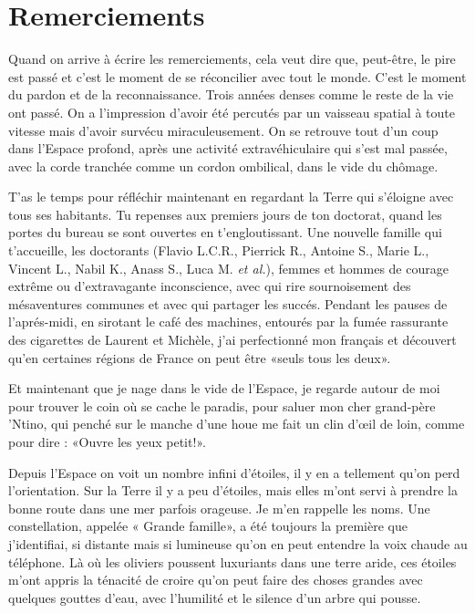 \chapter*{Remerciements}

Quand on arrive \`a \'ecrire les remerciements, cela veut dire que, peut-\^etre, le pire est pass\'e et c'est le moment de se r\'econcilier avec tout le monde. C'est le moment du pardon et de la reconnaissance.  Trois ann\'ees denses comme le reste de la vie ont pass\'e. On a l'impression d'avoir \'et\'e percut\'es par un vaisseau spatial \`a toute vitesse mais d'avoir surv\'ecu miraculeusement. On se retrouve tout d'un coup dans l'Espace profond, apr\`es une activit\'e extrav\'ehiculaire qui s'est mal pass\'ee, avec la corde tranch\'ee comme un cordon ombilical, dans le vide du ch\^omage.

T'as le temps pour r\'efl\'echir maintenant en regardant la Terre qui s'\'eloigne avec tous ses habitants. Tu repenses aux premiers jours de ton doctorat, quand les portes du bureau se sont ouvertes en t'engloutissant. Une nouvelle famille qui t'accueille, les doctorants (Flavio L.C.R., Pierrick R., Antoine S., Marie L., Vincent L., Nabil K., Anass S., Luca M. \textit{et al.}), femmes et hommes de courage extr\^eme ou d'extravagante inconscience, avec qui rire sournoisement des m\'esaventures communes et avec qui partager les succ\'es. Pendant les pauses de l'apr\'es-midi, en sirotant le caf\'e des machines, entour\'es par la fum\'ee rassurante des cigarettes de Laurent et Mich\`ele, j'ai perfectionn\'e mon français et d\'ecouvert qu'en certaines r\'egions de France on peut \^etre «seuls tous les deux».

Et maintenant que je nage dans le vide de l'Espace, je regarde autour de moi pour trouver le coin o\`u se cache le paradis, pour saluer mon cher grand-p\`ere 'Ntino, qui pench\'e sur le manche d'une houe me fait un clin d'œil de loin, comme pour dire : «Ouvre les yeux petit!».

Depuis l'Espace on voit un nombre infini d'\'etoiles, il y en a tellement qu'on perd l'orientation. Sur la Terre il y a peu d'\'etoiles, mais elles m'ont servi \`a prendre la bonne route dans une mer parfois orageuse. Je m'en rappelle les noms. Une constellation, appel\'ee « Grande famille», a \'et\'e toujours la premi\`ere que j'identifiai, si distante mais si lumineuse qu'on en peut entendre la voix chaude au t\'el\'ephone. L\`a o\`u les oliviers poussent luxuriants dans une terre aride, ces \'etoiles m'ont appris la t\'enacit\'e de croire qu'on peut faire des choses grandes avec quelques gouttes d'eau, avec l'humilit\'e et le silence d'un arbre qui pousse. 

